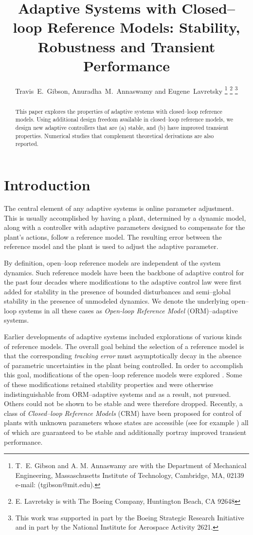 \documentclass[10pt,journal]{IEEEtran}
\title{Adaptive Systems with Closed--loop Reference Models: Stability, Robustness and Transient Performance}
\author{Travis~E.~Gibson,
Anuradha~M.~Annaswamy and
        Eugene~Lavretsky
\thanks{T.~E. Gibson and A. M. Annaswamy are with the Department
of Mechanical Engineering, Massaschusetts Institute of Technology, Cambridge,
MA, 02139 e-mail: ({tgibson@mit.edu}).}%
\thanks{E. Lavretsky is with The Boeing Company, Huntington Beach, CA 92648}%
\thanks{This work was supported in part by the Boeing Strategic Research Initiative and in part by the National Institute for Aerospace Activity 2621.}}
\theoremstyle{plain}%
\theoremstyle{definition}
\begin{document}
\maketitle


\begin{abstract}
This paper explores the properties of adaptive systems with closed--loop reference models. Using additional design freedom available in closed--loop reference models, we design new adaptive controllers that are (a) stable, and (b) have improved transient properties. Numerical studies that complement theoretical derivations are also reported.
\end{abstract}


\section{Introduction}
The central element of any adaptive systems is online parameter adjustment. This is usually accomplished by having a plant, determined by a dynamic model, along with a controller with adaptive parameters designed to compensate for the plant's actions, follow a reference model. The resulting error between the reference model and the plant is used to adjust the adaptive parameter. 


By definition, open--loop reference models are independent of the system dynamics. Such reference models have been the backbone of adaptive control for the past four decades \cite{annbook,ioabook} where modifications to the adaptive control law were first added for stability in the presence of bounded disturbances \cite{kre82,ioa83book,narendra86} and semi--global stability in the presence of unmodeled dynamics\cite{tsa86,nar87TAC}.  We denote the underlying open--loop systems in all these cases as {\em Open-loop Reference Model} (ORM)--adaptive systems.




Earlier developments of adaptive systems included explorations of various kinds of reference models. The overall goal behind the selection of a reference model is that the corresponding {\em tracking error} must asymptotically decay in the absence of parametric uncertainties in the plant being controlled. In order to accomplish this goal, modifications of the open--loop reference models were explored \cite{lan74,lan79}. Some of these modifications retained stability properties and were otherwise indistinguishable from ORM--adaptive systems and as a result, not pursued. Others could not be shown to be stable and were therefore dropped. Recently, a class of {\em Closed--loop Reference Models} (CRM) have been proposed for control of plants with unknown parameters whose states are accessible (see for example \cite{lav10aiaa,lav12tac,yale10,ste10,ste11}) all of which are guaranteed to be stable and additionally portray improved transient performance.
\end{document}
